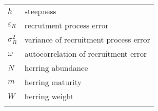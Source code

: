 \documentclass[]{article}
\begin{document}
\begin{longtable}[]{@{}ll@{}}
\begin{minipage}[t]{0.13\columnwidth}\raggedright\strut
\(h\)\strut
\end{minipage} & \begin{minipage}[t]{0.76\columnwidth}\raggedright\strut
steepness\strut
\end{minipage}\tabularnewline
\begin{minipage}[t]{0.13\columnwidth}\raggedright\strut
\(\varepsilon_R\)\strut
\end{minipage} & \begin{minipage}[t]{0.76\columnwidth}\raggedright\strut
recrutment process error\strut
\end{minipage}\tabularnewline
\begin{minipage}[t]{0.13\columnwidth}\raggedright\strut
\(\sigma_R^2\)\strut
\end{minipage} & \begin{minipage}[t]{0.76\columnwidth}\raggedright\strut
variance of recruitment process error\strut
\end{minipage}\tabularnewline
\begin{minipage}[t]{0.13\columnwidth}\raggedright\strut
\(\omega\)\strut
\end{minipage} & \begin{minipage}[t]{0.76\columnwidth}\raggedright\strut
autocorrelation of recruitment error\strut
\end{minipage}\tabularnewline
\begin{minipage}[t]{0.13\columnwidth}\raggedright\strut
\(N\)\strut
\end{minipage} & \begin{minipage}[t]{0.76\columnwidth}\raggedright\strut
herring abundance\strut
\end{minipage}\tabularnewline
\begin{minipage}[t]{0.13\columnwidth}\raggedright\strut
\(m\)\strut
\end{minipage} & \begin{minipage}[t]{0.76\columnwidth}\raggedright\strut
herring maturity\strut
\end{minipage}\tabularnewline
\begin{minipage}[t]{0.13\columnwidth}\raggedright\strut
\(W\)\strut
\end{minipage} & \begin{minipage}[t]{0.76\columnwidth}\raggedright\strut
herring weight\strut
\end{minipage}\tabularnewline
\begin{minipage}[t]{0.13\columnwidth}\raggedright\strut

\end{minipage}
\end{longtable}
\end{document}
